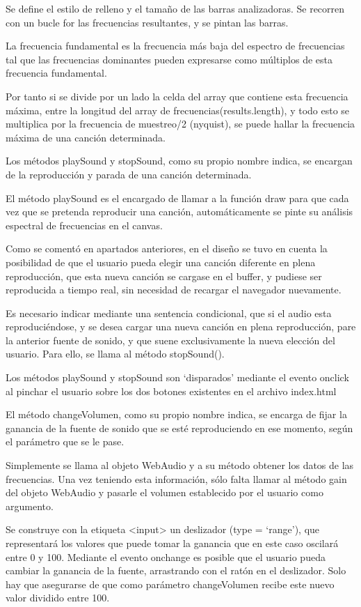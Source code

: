 Se define el estilo de relleno y el tamaño de las barras analizadoras.
Se recorren con un bucle for las frecuencias resultantes, y se pintan las barras.

La frecuencia fundamental es la frecuencia más baja del espectro de frecuencias tal que las frecuencias dominantes pueden expresarse como múltiplos de esta frecuencia fundamental.

Por tanto si se divide por un lado la celda del array que contiene esta frecuencia máxima, entre la longitud del array de frecuencias(results.length), y todo esto se multiplica por la frecuencia de muestreo/2 (nyquist),  se puede hallar la frecuencia máxima de una canción determinada.

Los métodos playSound y stopSound, como su propio nombre indica, se encargan de la reproducción y parada de una canción determinada.

El método playSound es el encargado de llamar a la función draw para que cada vez que se pretenda reproducir una canción, automáticamente se pinte su análisis espectral de frecuencias en el canvas. 

Como se comentó en apartados anteriores, en el diseño se tuvo en cuenta la posibilidad de que el usuario pueda elegir una canción diferente en plena reproducción, que esta nueva canción se cargase en el buffer, y pudiese ser reproducida a tiempo real, sin necesidad de recargar el navegador nuevamente.

Es necesario indicar mediante una sentencia condicional, que si el audio esta reproduciéndose, y se desea cargar una nueva canción en plena reproducción,   pare la anterior fuente de sonido, y que suene exclusivamente la nueva elección del usuario.  Para ello, se llama al método stopSound().

Los métodos playSound y stopSound son ‘disparados’ mediante el evento onclick al pinchar el usuario sobre los dos botones existentes en el archivo index.html

El método changeVolumen, como su propio nombre indica, se encarga de fijar la ganancia de la fuente de sonido que se esté reproduciendo en ese momento, según el parámetro que se le pase.

Simplemente se llama al objeto WebAudio y a su método obtener los datos de las frecuencias. Una vez teniendo esta información, sólo falta llamar al método gain del objeto WebAudio y pasarle el volumen establecido por el usuario como argumento.

Se construye con la etiqueta <input> un deslizador (type = ‘range’), que representará los valores que puede tomar la ganancia que en este caso oscilará entre 0 y 100. Mediante el evento onchange es posible que el usuario pueda cambiar la ganancia de la fuente, arrastrando con el ratón en el deslizador. Solo hay que asegurarse de que como parámetro changeVolumen recibe  este nuevo valor  dividido entre 100. 

